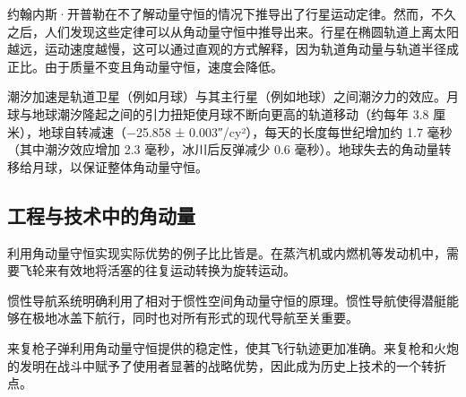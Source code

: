 约翰内斯·开普勒在不了解动量守恒的情况下推导出了行星运动定律。然而，不久之后，人们发现这些定律可以从角动量守恒中推导出来。行星在椭圆轨道上离太阳越远，运动速度越慢，这可以通过直观的方式解释，因为轨道角动量与轨道半径成正比。由于质量不变且角动量守恒，速度会降低。

潮汐加速是轨道卫星（例如月球）与其主行星（例如地球）之间潮汐力的效应。月球与地球潮汐隆起之间的引力扭矩使月球不断向更高的轨道移动（约每年 3.8 厘米），地球自转减速（−25.858 ± 0.003″/cy²），每天的长度每世纪增加约 1.7 毫秒（其中潮汐效应增加 2.3 毫秒，冰川后反弹减少 0.6 毫秒）。地球失去的角动量转移给月球，以保证整体角动量守恒。
\subsection{工程与技术中的角动量}
利用角动量守恒实现实际优势的例子比比皆是。在蒸汽机或内燃机等发动机中，需要飞轮来有效地将活塞的往复运动转换为旋转运动。

惯性导航系统明确利用了相对于惯性空间角动量守恒的原理。惯性导航使得潜艇能够在极地冰盖下航行，同时也对所有形式的现代导航至关重要。

来复枪子弹利用角动量守恒提供的稳定性，使其飞行轨迹更加准确。来复枪和火炮的发明在战斗中赋予了使用者显著的战略优势，因此成为历史上技术的一个转折点。